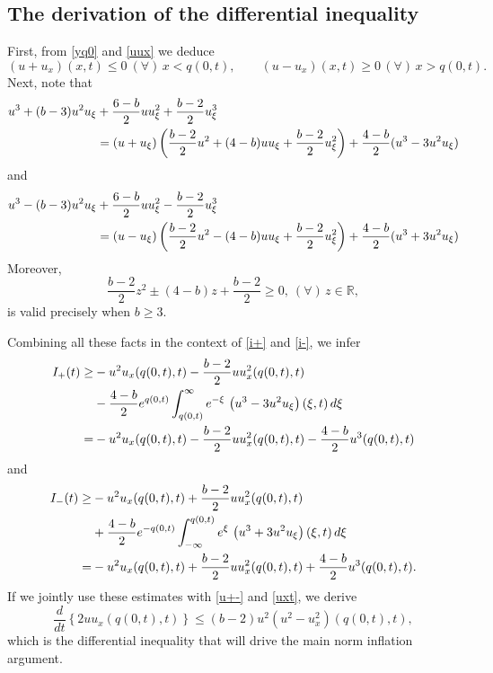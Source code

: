 \documentclass{amsart}
\newcommand{\R}{\mathbb R}
\begin{document}


\subsection*{The derivation of the differential inequality}
First, from \eqref{yq0} and \eqref{uux} we deduce
\begin{equation}
(u+u_x)(x,t)\leq 0\ (\forall)\, x<q(0,t), \qquad (u-u_x)(x,t)\geq 0 \,(\forall)\, x>q(0,t).
\label{u+-}
\end{equation}
Next, note that
\begin{equation*}
\aligned
u^3+(b-3)u^2u_\xi&+\frac{6-b}{2}uu_\xi^2+\frac{b-2}{2}u_\xi^3\\
&=(u+u_\xi)\left(\frac{b-2}{2}u^2+(4-b)uu_\xi+\frac{b-2}{2}u_\xi^2\right)+\frac{4-b}{2}(u^3-3u^2u_\xi)
\endaligned
\end{equation*}
and
\begin{equation*}
\aligned
u^3-(b-3)u^2u_\xi&+\frac{6-b}{2}uu_\xi^2-\frac{b-2}{2}u_\xi^3\\
&=(u-u_\xi)\left(\frac{b-2}{2}u^2-(4-b)uu_\xi+\frac{b-2}{2}u_\xi^2\right)+\frac{4-b}{2}(u^3+3u^2u_\xi)
\endaligned
\end{equation*}
Moreover, 
\begin{equation*}
\frac{b-2}{2}z^2\pm(4-b)z+\frac{b-2}{2}\geq 0,\ (\forall)\,z\in\R,
\end{equation*}
is valid precisely when $b\geq 3$.

Combining all these facts in the context of \eqref{i+} and \eqref{i-}, we infer
\begin{equation*}\aligned
I_+(t)
\geq& -u^2u_x(q(0,t), t)-\frac{b-2}{2}uu^2_x(q(0,t), t)\\
&-\frac{4-b}{2}e^{q(0,t)} \int_{q(0,t)}^\infty e^{-\xi} \,\left(u^3-3u^2u_\xi\right)(\xi,t)\,d\xi\\
=& -u^2u_x(q(0,t), t)-\frac{b-2}{2}uu^2_x(q(0,t), t)-\frac{4-b}{2}u^3(q(0,t), t)
\endaligned
\end{equation*}
and
\begin{equation*}\aligned
I_-(t)
\geq& -u^2u_x(q(0,t), t)+\frac{b-2}{2}uu^2_x(q(0,t), t)\\
&+\frac{4-b}{2}e^{-q(0,t)} \int^{q(0,t)}_{-\infty} e^{\xi} \,\left(u^3+3u^2u_\xi\right)(\xi,t)\,d\xi\\
=& -u^2u_x(q(0,t), t)+\frac{b-2}{2}uu^2_x(q(0,t), t)+\frac{4-b}{2}u^3(q(0,t), t).
\endaligned
\end{equation*}
If we jointly use these estimates with \eqref{u+-} and \eqref{uxt}, we derive
\begin{equation}
\frac{d}{dt}\left\{2 u u_x(q(0,t), t)\right\}\leq (b-2)u^2(u^2-u_x^2)(q(0,t), t),
\label{dtu}
\end{equation}
which is the differential inequality that will drive the main norm inflation argument.
\end{document}
